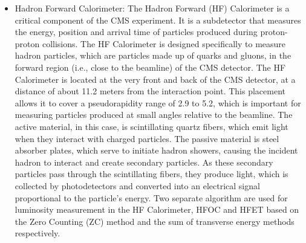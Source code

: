 \begin{itemize}

\item Hadron Forward Calorimeter: The Hadron Forward (HF) Calorimeter is a critical component of the CMS experiment. It is a subdetector that measures the energy, position and arrival time of particles produced during proton-proton collisions. The HF Calorimeter is designed specifically to measure hadron particles, which are particles made up of quarks and gluons, in the forward region (i.e., close to the beamline) of the CMS detector. The HF Calorimeter is located at the very front and back of the CMS detector, at a distance of about 11.2 meters from the interaction point. This placement allows it to cover a pseudorapidity range of 2.9 to 5.2, which is important for measuring particles produced at small angles relative to the beamline. %
The active material, in this case, is scintillating quartz fibers, which emit light when they interact with charged particles. The passive material is steel absorber plates, which serve to initiate hadron showers, causing the incident hadron to interact and create secondary particles. As these secondary particles pass through the scintillating fibers, they produce light, which is collected by photodetectors and converted into an electrical signal proportional to the particle's energy. Two separate algorithm are used for luminosity measurement in the HF Calorimeter, HFOC and HFET based on the Zero Counting (ZC) method and the sum of transverse energy methods respectively. %


\end{itemize}
